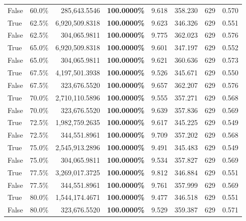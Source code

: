 \begin{table}[H]
\begin{tabular}{|m{}| m{}| r | R{0.13\textwidth}| R{0.09\textwidth}| R{0.09\textwidth}| R{0.09\textwidth}| R{0.11\textwidth}}
False & 60.0\% & \color{red} 285,643.5546 & \bfseries \color{red} 100.0000\% & 9.618 & 358.230 & 629 & 0.570 \\
True & 62.5\% & 6,920,509.8318 & \bfseries \color{red} 100.0000\% & 9.623 & 346.326 & 629 & 0.551 \\
False & 62.5\% & 304,065.9811 & \bfseries \color{red} 100.0000\% & 9.775 & 362.023 & 629 & 0.576 \\
True & 65.0\% & 6,920,509.8318 & \bfseries \color{red} 100.0000\% & 9.601 & 347.197 & 629 & 0.552 \\
False & 65.0\% & 304,065.9811 & \bfseries \color{red} 100.0000\% & 9.621 & 360.636 & 629 & 0.573 \\
True & 67.5\% & 4,197,501.3938 & \bfseries \color{red} 100.0000\% & 9.526 & 345.671 & 629 & 0.550 \\
False & 67.5\% & 323,676.5520 & \bfseries \color{red} 100.0000\% & 9.657 & 362.207 & 629 & 0.576 \\
True & 70.0\% & 2,710,110.5896 & \bfseries \color{red} 100.0000\% & 9.555 & 357.271 & 629 & 0.568 \\
False & 70.0\% & 323,676.5520 & \bfseries \color{red} 100.0000\% & 9.639 & 357.836 & 629 & 0.569 \\
True & 72.5\% & 1,982,759.2635 & \bfseries \color{red} 100.0000\% & 9.617 & 345.225 & 629 & 0.549 \\
False & 72.5\% & 344,551.8961 & \bfseries \color{red} 100.0000\% & 9.709 & 357.202 & 629 & 0.568 \\
True & 75.0\% & 2,545,913.2896 & \bfseries \color{red} 100.0000\% & 9.491 & 345.483 & 629 & 0.549 \\
False & 75.0\% & 304,065.9811 & \bfseries \color{red} 100.0000\% & 9.534 & 357.827 & 629 & 0.569 \\
True & 77.5\% & 3,269,017.3725 & \bfseries \color{red} 100.0000\% & 9.812 & 346.884 & 629 & 0.551 \\
False & 77.5\% & 344,551.8961 & \bfseries \color{red} 100.0000\% & 9.761 & 357.999 & 629 & 0.569 \\
True & 80.0\% & 1,544,174.4671 & \bfseries \color{red} 100.0000\% & 9.477 & 346.518 & 629 & 0.551 \\
False & 80.0\% & 323,676.5520 & \bfseries \color{red} 100.0000\% & 9.529 & 359.387 & 629 & 0.571 \\

\end{tabular}
\end{table}
